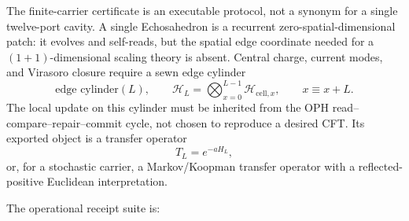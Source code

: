 \documentclass[11pt]{article}
\theoremstyle{remark}
\theoremstyle{plain}
\begin{document}
The finite-carrier certificate is an executable protocol, not a synonym for a single
twelve-port cavity. A single Echosahedron is a recurrent zero-spatial-dimensional patch: it evolves
and self-reads, but the spatial edge coordinate needed for a
\((1+1)\)-dimensional scaling theory is absent. Central charge, current modes, and Virasoro closure
require a sewn edge cylinder
\[
\text{edge cylinder}(L),
\qquad
\mathcal H_L=\bigotimes_{x=0}^{L-1}\mathcal H_{\mathrm{cell},x},
\qquad x\equiv x+L.
\]
The local update on this cylinder must be inherited from the OPH read--compare--repair--commit
cycle, not chosen to reproduce a desired CFT. Its exported object is a transfer operator
\[
T_L=e^{-aH_L},
\]
or, for a stochastic carrier, a Markov/Koopman transfer operator with a reflected-positive
Euclidean interpretation.

The operational receipt suite is:
\end{document}
